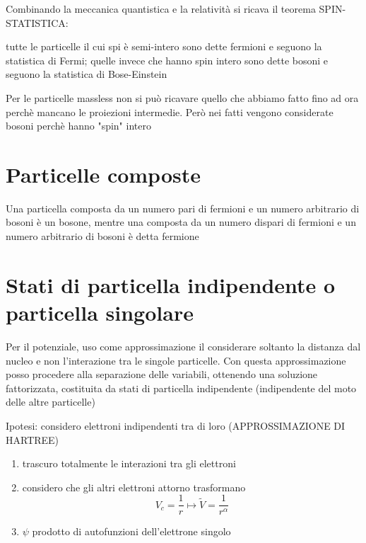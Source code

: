 \noindent Combinando la meccanica quantistica e la relatività si ricava il teorema SPIN-STATISTICA: 

\noindent tutte le particelle il cui spi è semi-intero sono dette fermioni e seguono la statistica di Fermi; quelle invece che hanno spin intero sono dette bosoni e seguono la statistica di Bose-Einstein

\noindent Per le particelle massless non si può ricavare quello che abbiamo fatto fino ad ora perchè mancano le proiezioni intermedie. Però nei fatti vengono considerate bosoni perchè hanno "spin" intero

\section{Particelle composte}

Una particella composta da un numero pari di fermioni e un numero arbitrario di bosoni è un bosone, mentre una composta da un numero dispari di fermioni e un numero arbitrario di bosoni è detta fermione

\section{Stati di particella indipendente o particella singolare}

Per il potenziale, uso come approssimazione il considerare soltanto la distanza dal nucleo e non l'interazione tra le singole particelle.
Con questa approssimazione posso procedere alla separazione delle variabili, ottenendo una soluzione fattorizzata, costituita da stati di particella indipendente (indipendente del moto delle altre particelle)

\noindent Ipotesi: considero elettroni indipendenti tra di loro (APPROSSIMAZIONE DI HARTREE)

\begin{enumerate}
    \item trascuro totalmente le interazioni tra gli elettroni 
    \item considero che gli altri elettroni attorno trasformano
    \begin{equation*}
        V_c = \frac{1}{r} \mapsto \tilde{V} = \frac{1}{r^\alpha}
    \end{equation*}
    \item \(\psi\) prodotto di autofunzioni dell'elettrone singolo
\end{enumerate}

